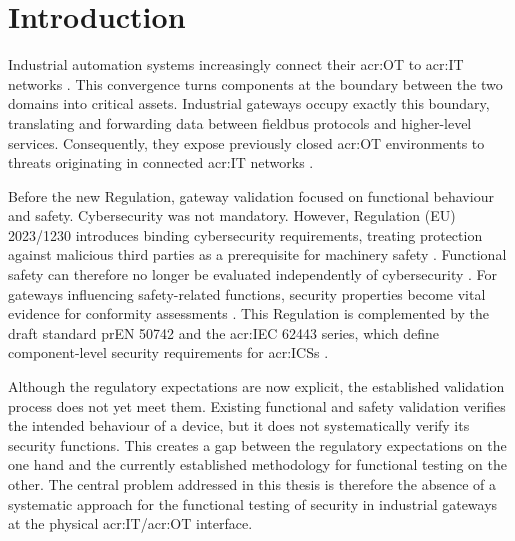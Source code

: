 \chapter{Introduction} 
\label{chap:introduction} 


Industrial automation systems increasingly connect their \gls{acr:OT} to \gls{acr:IT} networks \autocite[2, 9]{EHIE2020103166}. This convergence turns components at the boundary between the two domains into critical assets. Industrial gateways occupy exactly this boundary, translating and forwarding data between fieldbus protocols and higher-level services. Consequently, they expose previously closed \gls{acr:OT} environments to threats originating in connected \gls{acr:IT} networks \autocite[199]{8586807} \cite[p. 33]{enisa2018iot_smart_manufacturing}.



Before the new Regulation, gateway validation focused on functional behaviour and safety. Cybersecurity was not mandatory. However, Regulation (EU) 2023/1230 introduces binding cybersecurity requirements, treating protection against malicious third parties as a prerequisite for machinery safety \autocite[5]{EU2023_1230}. Functional safety can therefore no longer be evaluated independently of cybersecurity \autocite{carl2026_maschinenverordnung}. For gateways influencing safety-related functions, security properties become vital evidence for conformity assessments \cite[pp. 1]{tuv_functional_safety_cybersecurity_faq_pdf}. This Regulation is complemented by the draft standard prEN 50742 and the \gls{acr:IEC} 62443 series, which define component-level security requirements for \glspl{acr:ICS} \autocite{prEN50742_2025, IEC62443-4-2}.


Although the regulatory expectations are now explicit, the established validation process does not yet meet them. Existing functional and safety validation verifies the intended behaviour of a device, but it does not systematically verify its security functions. This creates a gap between the regulatory expectations on the one hand and the currently established methodology for functional testing on the other. The central problem addressed in this thesis is therefore the absence of a systematic approach for the functional testing of security in industrial gateways at the physical \gls{acr:IT}/\gls{acr:OT} interface.

